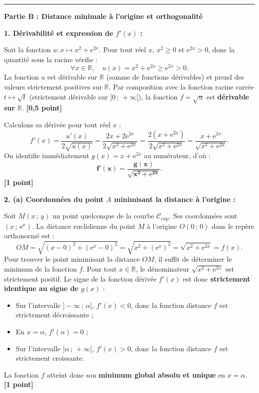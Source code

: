 \documentclass[11pt,a4paper]{article}
\newcommand{\R}{\mathbb{R}}
\newcommand{\e}{\mathrm{e}}
\begin{document}
\begin{correctionbox}
\vspace{0.3cm}
\hrule
\vspace{0.3cm}

\textbf{Partie B : Distance minimale à l'origine et orthogonalité}

\textbf{1. Dérivabilité et expression de $f'(x)$ :}

Soit la fonction $u : x \mapsto x^2 + \e^{2x}$.
Pour tout réel $x$, $x^2 \ge 0$ et $\e^{2x} > 0$, donc la quantité sous la racine vérifie :
\[
\forall x \in \R, \quad u(x) = x^2 + \e^{2x} \ge \e^{2x} > 0.
\]
La fonction $u$ est dérivable sur $\R$ (somme de fonctions dérivables) et prend des valeurs strictement positives sur $\R$.
Par composition avec la fonction racine carrée $t \mapsto \sqrt{t}$ (strictement dérivable sur $]0\,;\,+\infty[$), la fonction $f = \sqrt{u}$ est \textbf{dérivable sur $\R$}. \hfill \textbf{[0{,}5 point]}

Calculons sa dérivée pour tout réel $x$ :
\[
f'(x) = \frac{u'(x)}{2\sqrt{u(x)}} = \frac{2x + 2\e^{2x}}{2\sqrt{x^2 + \e^{2x}}} = \frac{2(x + \e^{2x})}{2\sqrt{x^2 + \e^{2x}}} = \frac{x + \e^{2x}}{\sqrt{x^2 + \e^{2x}}}.
\]
On identifie immédiatement $g(x) = x + \e^{2x}$ au numérateur, d'où :
\[
\mathbf{f'(x) = \frac{g(x)}{\sqrt{x^2 + \e^{2x}}}}.
\] \hfill \textbf{[1 point]}

\medskip
\textbf{2. (a) Coordonnées du point $A$ minimisant la distance à l'origine :}

Soit $M(x\,;\,y)$ un point quelconque de la courbe $\mathcal{C}_{\exp}$. Ses coordonnées sont $(x\,;\,\e^x)$.
La distance euclidienne du point $M$ à l'origine $O(0\,;\,0)$ dans le repère orthonormé est :
\[
OM = \sqrt{(x - 0)^2 + (\e^x - 0)^2} = \sqrt{x^2 + (\e^x)^2} = \sqrt{x^2 + \e^{2x}} = f(x).
\]
Pour trouver le point minimisant la distance $OM$, il suffit de déterminer le minimum de la fonction $f$.
Pour tout $x \in \R$, le dénominateur $\sqrt{x^2 + \e^{2x}}$ est strictement positif.
Le signe de la fonction dérivée $f'(x)$ est donc \textbf{strictement identique au signe de $g(x)$} :
\begin{itemize}[leftmargin=*]
    \item Sur l'intervalle $]-\infty\,;\,\alpha[$, $f'(x) < 0$, donc la fonction distance $f$ est strictement décroissante ;
    \item En $x = \alpha$, $f'(\alpha) = 0$ ;
    \item Sur l'intervalle $]\alpha\,;\,+\infty[$, $f'(x) > 0$, donc la fonction distance $f$ est strictement croissante.
\end{itemize}
La fonction $f$ atteint donc son \textbf{minimum global absolu et unique} en $x = \alpha$. \hfill \textbf{[1 point]}


\end{correctionbox}
\end{document}
